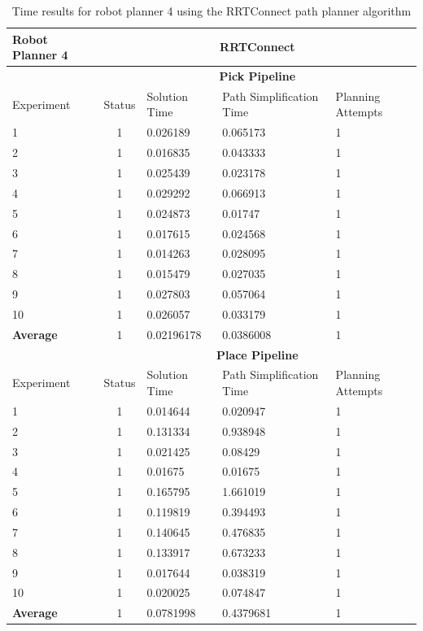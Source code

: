 \begin{table}[H]
\centering
\begin{tabular}{|p{2cm}|c|p{3cm}|p{3cm}|p{3cm}|}
\hline
Robot Planner 4           & \multicolumn{4}{c}{\textbf{RRTConnect}}                                                                                                 \vline \\
\hline
                          & \multicolumn{4}{c}{\textbf{Pick Pipeline}}                     \vline \\
\hline
Experiment                & Status & Solution Time & Path Simplification Time & Planning Attempts  \\
\hline
1 & 1 & 0.026189 & 0.065173 & 1 \\
2 & 1 & 0.016835 & 0.043333 & 1 \\
3 & 1 & 0.025439 & 0.023178 & 1 \\
4 & 1 & 0.029292 & 0.066913 & 1 \\
5 & 1 & 0.024873 & 0.01747 & 1 \\
6 & 1 & 0.017615 & 0.024568 & 1 \\
7 & 1 & 0.014263 & 0.028095 & 1 \\
8 & 1 & 0.015479 & 0.027035 & 1 \\
9 & 1 & 0.027803 & 0.057064 & 1 \\
10 & 1 & 0.026057 & 0.033179 & 1 \\
\hline
\textbf{Average} & 1	& 0.02196178	& 0.0386008	& 1 \\
\hline
                          & \multicolumn{4}{c}{\textbf{Place Pipeline}}                     \vline \\
\hline
Experiment                & Status & Solution Time & Path Simplification Time & Planning Attempts  \\
\hline
1 & 1 & 0.014644 & 0.020947 & 1 \\
2 & 1 & 0.131334 & 0.938948 & 1 \\
3 & 1 & 0.021425 & 0.08429 & 1 \\
4 & 1 & 0.01675 & 0.01675 & 1 \\
5 & 1 & 0.165795 & 1.661019 & 1 \\
6 & 1 & 0.119819 & 0.394493 & 1 \\
7 & 1 & 0.140645 & 0.476835 & 1 \\
8 & 1 & 0.133917 & 0.673233 & 1 \\
9 & 1 & 0.017644 & 0.038319 & 1 \\
10 & 1 & 0.020025 & 0.074847 & 1 \\
\hline
\textbf{Average} & 1	& 0.0781998	& 0.4379681	& 1 \\
\hline
\end{tabular}
\caption{Time results for robot planner 4 using the RRTConnect path planner algorithm}
\label{robot-planner4-rrtconnect-data}
\end{table}

